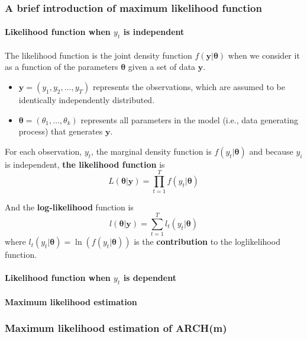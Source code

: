 \documentclass[a4paper,11pt]{article}
\begin{document}
\subsubsection{A brief introduction of maximum likelihood function}
\label{sec:orgf001277}

\paragraph*{Likelihood function when \(y_t\) is independent}
\label{sec:orgad8a990}

The likelihood function is the joint density function \(f(\mathbf{y} |
\boldsymbol{\theta})\) when we consider it as a function of the
parameters \(\boldsymbol{\theta}\) given a set of data \(\mathbf{y}\).
\begin{itemize}
\item \(\mathbf{y} = (y_1, y_2, \ldots, y_T)\) represents the observations,
which are assumed to be identically independently distributed.
\item \(\boldsymbol{\theta} = (\theta_1, \ldots, \theta_k)\) represents all
parameters in the model (i.e., data generating process) that
generates \(\mathbf{y}\).
\end{itemize}

For each observation, \(y_t\), the marginal density function is \(f(y_t |
\boldsymbol{\theta})\) and because \(y_i\) is independent, \textbf{the
likelihood function} is
\begin{equation}
\label{eq:general-likelihood}
L(\boldsymbol{\theta} | \mathbf{y}) = \prod_{t=1}^T f(y_t | \boldsymbol{\theta})
\end{equation}

And the \textbf{log-likelihood} function is 
\begin{equation}
\label{eq:general-logL}
l(\boldsymbol{\theta} | \mathbf{y}) = \sum_{t=1}^T l_t(y_t | \boldsymbol{\theta})
\end{equation}
where \(l_t(y_t | \boldsymbol{\theta}) = \ln\left(f(y_t |
\boldsymbol{\theta})\right)\) is the \textbf{contribution} to the
loglikelihood function. 

\paragraph*{Likelihood function when \(y_t\) is dependent}
\label{sec:org59de07e}

\paragraph*{Maximum likelihood estimation}
\label{sec:orgf794a21}


\subsubsection{Maximum likelihood estimation of ARCH(m)}
\label{sec:org953071f}
\end{document}
